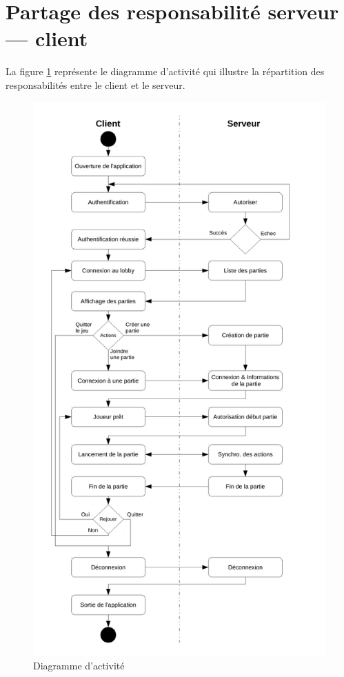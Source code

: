 \documentclass[a4paper,11pt]{article}
\begin{document}
	\section{Partage des responsabilité serveur --- client}

	La figure \ref{diagramme_activite} représente le diagramme d'activité qui illustre la répartition des responsabilités entre le client et le serveur.
	\begin{figure}[!ht]
		\centering
		\includegraphics[scale=0.6]{Diagramme_Activite.pdf}
		\caption{Diagramme d'activité}
		\label{diagramme_activite}
	\end{figure}
\end{document}

